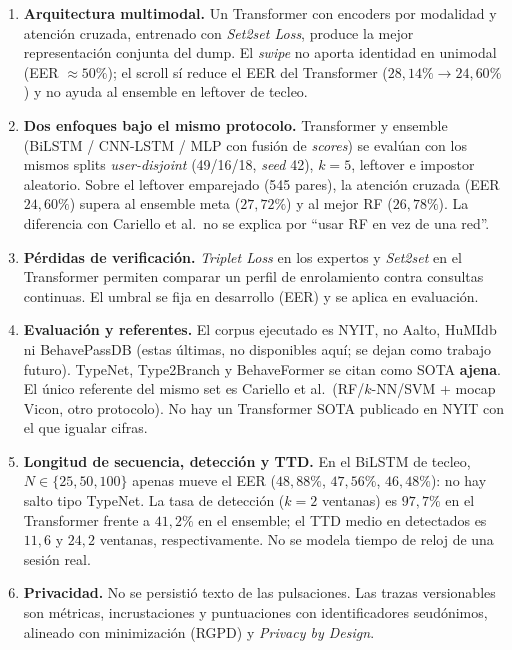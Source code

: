 \begin{enumerate}
    \item \textbf{Arquitectura multimodal.} Un Transformer con encoders por modalidad y atención cruzada,
    entrenado con \textit{Set2set Loss}, produce la mejor representación conjunta del dump. El \textit{swipe}
    no aporta identidad en unimodal (EER $\approx 50\%$); el scroll sí reduce el EER del
    Transformer ($28{,}14\%\to 24{,}60\%$) y no ayuda al ensemble en leftover de tecleo.

    \item \textbf{Dos enfoques bajo el mismo protocolo.} Transformer y ensemble (BiLSTM / CNN-LSTM / MLP
    con fusión de \textit{scores}) se evalúan con los mismos splits \textit{user-disjoint} (49/16/18,
    \textit{seed} 42), $k=5$, leftover e impostor aleatorio. Sobre el leftover emparejado (545 pares),
    la atención cruzada (EER $24{,}60\%$) supera al ensemble meta ($27{,}72\%$) y al mejor RF ($26{,}78\%$).
    La diferencia con Cariello et al.\ no se explica por ``usar RF en vez de una red''.

    \item \textbf{Pérdidas de verificación.} \textit{Triplet Loss} en los expertos y \textit{Set2set} en
    el Transformer permiten comparar un perfil de enrolamiento contra consultas continuas. El umbral se
    fija en desarrollo (EER) y se aplica en evaluación.

    \item \textbf{Evaluación y referentes.} El corpus ejecutado es NYIT, no Aalto, HuMIdb ni BehavePassDB
    (estas últimas, no disponibles aquí; se dejan como trabajo futuro). TypeNet, Type2Branch y BehaveFormer
    se citan como SOTA \textbf{ajena}. El único referente del mismo set es Cariello et al.\ (RF/$k$-NN/SVM + mocap Vicon, otro protocolo). No hay un Transformer SOTA
    publicado en NYIT con el que igualar cifras.

    \item \textbf{Longitud de secuencia, detección y TTD.} En el BiLSTM de tecleo, $N\in\{25,50,100\}$ apenas mueve
    el EER ($48{,}88\%$, $47{,}56\%$, $46{,}48\%$): no hay salto tipo TypeNet. La tasa de detección ($k=2$ ventanas)
    es $97{,}7\%$ en el Transformer frente a $41{,}2\%$ en el ensemble; el TTD medio en detectados es $11{,}6$ y
    $24{,}2$ ventanas, respectivamente. No se modela tiempo de reloj de una sesión real.

    \item \textbf{Privacidad.} No se persistió texto de las pulsaciones. Las trazas versionables son
    métricas, incrustaciones y puntuaciones con identificadores seudónimos, alineado con minimización
    (RGPD) y \textit{Privacy by Design}.
\end{enumerate}

